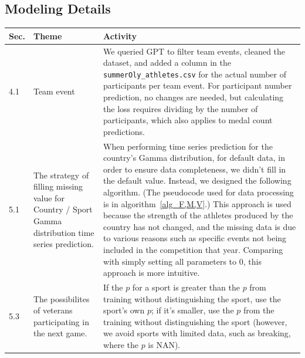 \documentclass{mcmthesis}
\begin{document}
\newpage

\begin{appendices}
\section{Modeling Details}
\label{appA}


\begin{tabular}{|p{1cm}|p{3cm}|p{10cm}|}
\hline
\textbf{Sec.} & \textbf{Theme} & \textbf{Activity} \\
\hline
4.1 & Team event & %
We queried GPT to filter team events, cleaned the dataset, and added a column in the {\texttt{summerOly\_athletes.csv}} for the actual number of participants per team event. For participant number prediction, no changes are needed, but calculating the loss requires dividing by the number of participants, which also applies to medal count predictions.\\
\hline
5.1 & The strategy of filling missing value for Country / Sport Gamma distribution time series prediction. & When performing time series prediction for the country’s Gamma distribution, for default data, in order to ensure data completeness, we didn't fill in the default value. Instead, we designed the following algorithm. (The pseudocode used for data processing is in algorithm~\ref{alg_F,M,V}.) This approach is used because the strength of the athletes produced by the country has not changed, and the missing data is due to various reasons such as specific events not being included in the competition that year. Comparing with simply setting all parameters to 0, this approach is more intuitive.  \\
\hline
5.3 & The possibilites of veterans participating in the next game. & If the \( p \) for a sport is greater than the \( p \) from training without distinguishing the sport, use the sport's own \( p \); if it's smaller, use the \( p \) from the training without distinguishing the sport (however, we avoid sports with limited data, such as breaking, where the \( p \) is NAN).
 \\
\hline
\end{tabular}




\end{appendices}
\end{document}
